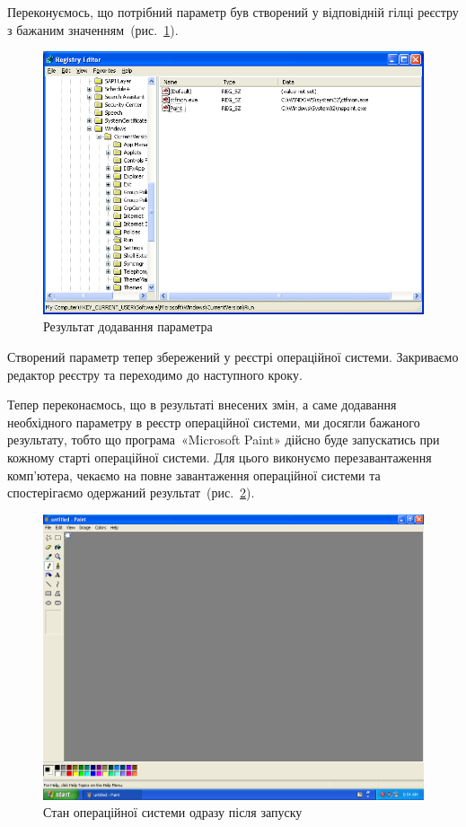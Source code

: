 \documentclass[
	a4paper,
	oneside,
	DIV = 12,
	fontsize = 13pt,
	headings = normal,
]{scrartcl}
\begin{document}
		Переконуємось, що потрібний параметр був створений у відповідній гілці реєстру з бажаним значенням~(рис.~\ref{fig:parameter-edit-res}).

		\begin{figure}[!htbp]
			\centering
			\includegraphics[height = 12\baselineskip]{../01-solution/y03s01-pcdiag-lab-07-p03.png}
			\caption{Результат додавання параметра}
			\label{fig:parameter-edit-res}
		\end{figure}

		Створений параметр тепер збережений у реєстрі операційної системи. Закриваємо редактор реєстру та переходимо до наступного кроку. 

		Тепер переконаємось, що в результаті внесених змін, а саме додавання необхідного параметру в реєстр операційної системи, ми досягли бажаного результату, тобто що програма~«\textenglish{Microsoft Paint}» дійсно буде запускатись при кожному старті операційної системи. Для цього виконуємо перезавантаження комп'ютера, чекаємо на повне завантаження операційної системи та спостерігаємо одержаний результат~(рис.~\ref{fig:paint-result}).

		\begin{figure}[!htbp]
			\centering
			\includegraphics[height = 14\baselineskip]{../01-solution/y03s01-pcdiag-lab-07-p04.png}
			\caption{Стан операційної системи одразу після запуску}
			\label{fig:paint-result}
		\end{figure}
\end{document}
